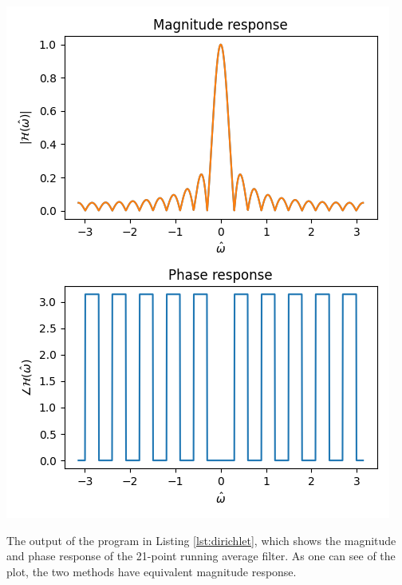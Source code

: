 \begin{marginfigure}
\begin{center}
\includegraphics[width=\textwidth]{code/019_frequency_response/dirichlet21.png}
\end{center}
\caption{The output of the program in Listing \ref{lst:dirichlet}, which shows the magnitude and phase response of the 21-point running average filter. As one can see of the plot, the two methods have equivalent magnitude response.}
\label{fig:output_dirichlet}
\end{marginfigure}

